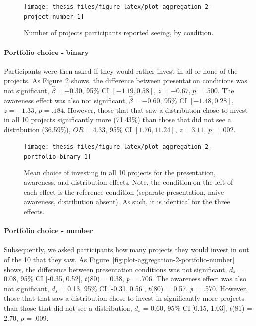 \documentclass[a4paper, nobind, dvipsnames]{templates/ociamthesis}
\theoremstyle{definition}
\theoremstyle{definition}
\theoremstyle{definition}
\theoremstyle{definition}
\theoremstyle{remark}
\begin{document}
\begin{figure}
\texttt{[image: thesis\_files/figure-latex/plot-aggregation-2-project-number-1]} \caption{Number of projects participants reported seeing, by condition.}\label{fig:plot-aggregation-2-project-number}
\end{figure}

\paragraph{Portfolio choice - binary}

Participants were then asked if they would rather invest in all or none of the
projects. As Figure~\ref{fig:plot-aggregation-2-portfolio-binary} shows, the
difference between presentation conditions was not significant,
\(\hat{\beta} = -0.30\), 95\% CI \([-1.19, 0.58]\), \(z = -0.67\), \(p = .500\). The
awareness effect was also not significant,
\(\hat{\beta} = -0.60\), 95\% CI \([-1.48, 0.28]\), \(z = -1.33\), \(p = .184\). However,
those that that saw a distribution chose to invest in all 10 projects
significantly more
(71.43\%) than
those that did not see a distribution
(36.59\%),
\(OR = 4.33\), 95\% CI \([1.76, 11.24]\), \(z = 3.11\), \(p = .002\).



\begin{figure}
\texttt{[image: thesis\_files/figure-latex/plot-aggregation-2-portfolio-binary-1]} \caption{Mean choice of investing in all 10 projects for the presentation, awareness, and distribution effects. Note, the condition on the left of each effect is the reference condition (separate presentation, naive awareness, distribution absent). As such, it is identical for the three effects.}\label{fig:plot-aggregation-2-portfolio-binary}
\end{figure}

\paragraph{Portfolio choice - number}

Subsequently, we asked participants how many projects they would invest in out
of the 10 that they saw. As
Figure~\ref{fig:plot-aggregation-2-portfolio-number} shows, the difference
between presentation conditions was not significant,
\(d_s\) = 0.08, 95\% CI {[}-0.35, 0.52{]}, \(t\)(80) = 0.38, \(p\) = .706. The awareness effect
was also not significant, \(d_s\) = 0.13, 95\% CI {[}-0.31, 0.56{]}, \(t\)(80) = 0.57, \(p\) = .570.
However, those that that saw a distribution chose to invest in significantly
more projects than those that did not see a distribution,
\(d_s\) = 0.60, 95\% CI {[}0.15, 1.03{]}, \(t\)(81) = 2.70, \(p\) = .009.
\end{document}
